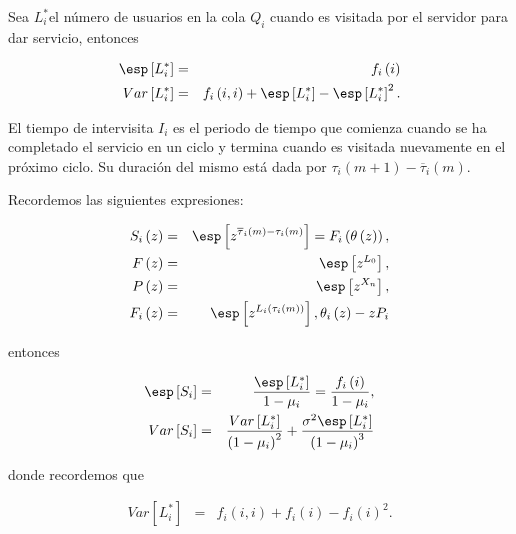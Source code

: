 \begin{Def}
Sea $L_{i}^{*}$el n\'umero de usuarios en la cola $Q_{i}$ cuando es visitada por el servidor para dar servicio, entonces

\begin{eqnarray}
\esp\left[L_{i}^{*}\right]&=&f_{i}\left(i\right)\\
Var\left[L_{i}^{*}\right]&=&f_{i}\left(i,i\right)+\esp\left[L_{i}^{*}\right]-\esp\left[L_{i}^{*}\right]^{2}.
\end{eqnarray}

\end{Def}


\begin{Def}
El tiempo de intervisita $I_{i}$ es el periodo de tiempo que comienza cuando se ha completado el servicio en un ciclo y termina cuando es visitada nuevamente en el pr\'oximo ciclo. Su  duraci\'on del mismo est\'a dada por $\tau_{i}\left(m+1\right)-\overline{\tau}_{i}\left(m\right)$.
\end{Def}


Recordemos las siguientes expresiones:

\begin{eqnarray*}
S_{i}\left(z\right)&=&\esp\left[z^{\overline{\tau}_{i}\left(m\right)-\tau_{i}\left(m\right)}\right]=F_{i}\left(\theta\left(z\right)\right),\\
F\left(z\right)&=&\esp\left[z^{L_{0}}\right],\\
P\left(z\right)&=&\esp\left[z^{X_{n}}\right],\\
F_{i}\left(z\right)&=&\esp\left[z^{L_{i}\left(\tau_{i}\left(m\right)\right)}\right],
\theta_{i}\left(z\right)-zP_{i}
\end{eqnarray*}

entonces 

\begin{eqnarray*}
\esp\left[S_{i}\right]&=&\frac{\esp\left[L_{i}^{*}\right]}{1-\mu_{i}}=\frac{f_{i}\left(i\right)}{1-\mu_{i}},\\
Var\left[S_{i}\right]&=&\frac{Var\left[L_{i}^{*}\right]}{\left(1-\mu_{i}\right)^{2}}+\frac{\sigma^{2}\esp\left[L_{i}^{*}\right]}{\left(1-\mu_{i}\right)^{3}}
\end{eqnarray*}

donde recordemos que

\begin{eqnarray*}
Var\left[L_{i}^{*}\right]&=&f_{i}\left(i,i\right)+f_{i}\left(i\right)-f_{i}\left(i\right)^{2}.
\end{eqnarray*}

